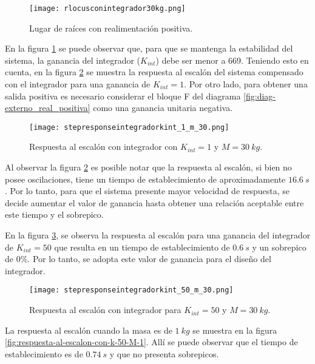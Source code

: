 \begin{figure}[H]
	\centering
	\texttt{[image: rlocusconintegrador30kg.png]}
	\caption{Lugar de raíces con realimentación positiva.}
	\label{fig:lugar-de-raices-con-integrador-analog}
\end{figure}
 
\noindent En la figura \ref{fig:lugar-de-raices-con-integrador-analog} se puede observar que, para que se mantenga la estabilidad del sistema, la ganancia del integrador ($K_{int}$) debe ser menor a 669. Teniendo esto en cuenta, en la figura \ref{fig:respuesta-al-escalon-con-k-1-M-30-analog} se muestra la respuesta al escalón del sistema compensado con el integrador para una ganancia de $K_{int}=1$. Por otro lado, para obtener una salida positiva es necesario considerar el bloque F del diagrama \ref{fig:diag-externo_real_positiva} como una ganancia unitaria negativa.

\begin{figure}[H]
	\centering
	\texttt{[image: stepresponseintegradorkint\_1\_m\_30.png]}
	\caption{Respuesta al escalón con integrador con $K_{int} =1$ y $M=30\:kg$.}
	\label{fig:respuesta-al-escalon-con-k-1-M-30-analog}
\end{figure}

Al observar la figura \ref{fig:respuesta-al-escalon-con-k-1-M-30-analog} es posible notar que la respuesta al escalón, si bien no posee oscilaciones, tiene un tiempo de establecimiento de aproximadamente $16.6 \:s$. Por lo tanto, para que el sistema presente mayor velocidad de respuesta, se decide aumentar el valor de ganancia hasta obtener una relación aceptable entre este tiempo y el sobrepico.



\noindent En la figura \ref{fig:respuesta-al-escalon-con-k-50-M-30}, se observa la respuesta al escalón para una ganancia del integrador de $K_{int}=50$ que resulta en un tiempo de establecimiento de $0.6\:s$ y un sobrepico de 0\%. Por lo tanto, se adopta este valor de ganancia para el diseño del integrador.

\begin{figure}[H]
	\centering
	\texttt{[image: stepresponseintegradorkint\_50\_m\_30.png]}
	\caption{Respuesta al escalón con integrador para $K_{int}=50$ y $M = 30\:kg$.}
	\label{fig:respuesta-al-escalon-con-k-50-M-30}
\end{figure}

\noindent La respuesta al escal\'{o}n cuando la masa es de $1 \:kg$ se muestra en la figura \ref{fig:respuesta-al-escalon-con-k-50-M-1}. All\'{i} se puede observar que el tiempo de establecimiento es de $0.74\:s$ y que no presenta sobrepicos.

